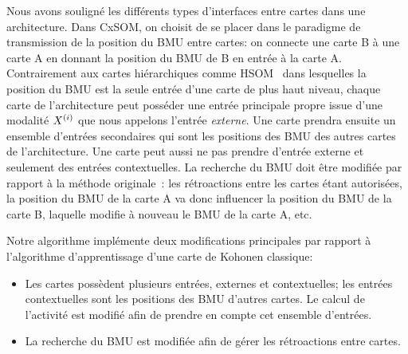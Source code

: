 \documentclass[../main]{subfiles}
\begin{document}
Nous avons souligné les différents types d'interfaces entre cartes dans une architecture.
Dans CxSOM, on choisit de se placer dans le paradigme de transmission de la position du BMU entre cartes: on connecte une carte B à une carte A en donnant la position du BMU de B en entrée à la carte A. 
Contrairement aux cartes hiérarchiques comme HSOM~\parencite{lampinen_clustering_1992} dans lesquelles la position du BMU est la seule entrée d'une carte de plus haut niveau, chaque carte de l'architecture peut posséder une entrée principale propre issue d'une modalité $X^{({i})}$ que nous appelons l'entrée \emph{externe}. 
Une carte prendra ensuite un ensemble d'entrées secondaires qui sont les positions des BMU des autres cartes de l'architecture. 
Une carte peut aussi ne pas prendre d'entrée externe et seulement des entrées contextuelles.
La recherche du BMU doit être modifiée par rapport à la méthode originale~: les rétroactions entre les cartes étant autorisées, la position du BMU de la carte A va donc influencer la position du BMU de la carte B, laquelle modifie à nouveau le BMU de la carte A, etc. 

Notre algorithme implémente deux modifications principales par rapport à l'algorithme d'apprentissage d'une carte de Kohonen classique: 
\begin{itemize}
\item Les cartes possèdent plusieurs entrées, externes et contextuelles; les entrées contextuelles sont les positions des BMU d'autres cartes. Le calcul de l'activité est modifié afin de prendre en compte cet ensemble d'entrées.
\item La recherche du BMU est modifiée afin de gérer les rétroactions entre cartes.
\end{itemize}
\end{document}

